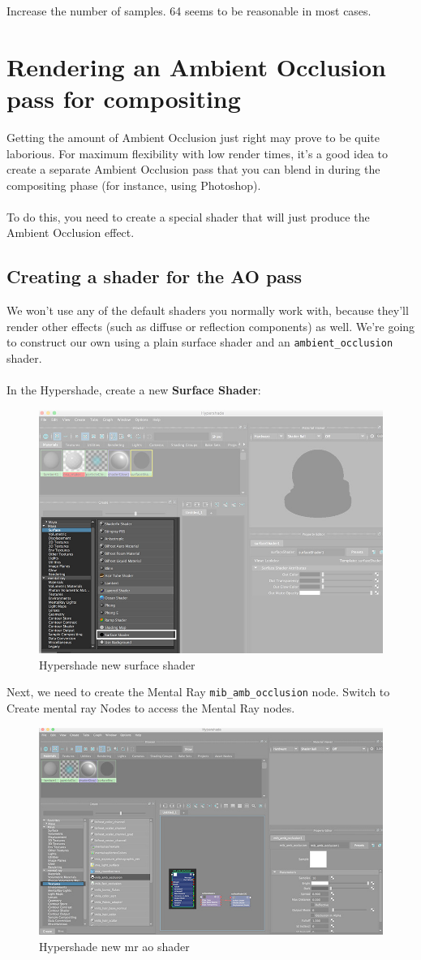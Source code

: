 \documentclass[10pt,a4paper]{article}
\begin{document}
Increase the number of samples. 64 seems to be reasonable in most cases.

\section{Rendering an Ambient Occlusion pass for compositing}
Getting the amount of Ambient Occlusion just right may prove to be quite laborious. For maximum flexibility with low render times, it's a good idea to create a separate Ambient Occlusion pass that you can blend in during the compositing phase (for instance, using Photoshop).
\\
\\
To do this, you need to create a special shader that will just produce the Ambient Occlusion effect.

\subsection{Creating a shader for the AO pass}
We won't use any of the default shaders you normally work with, because they'll render other effects (such as diffuse or reflection components) as well. We're going to construct our own using a plain surface shader and an \lstinline{ambient_occlusion} shader.
\\
\\
In the Hypershade, create a new \textbf{Surface Shader}:

\begin{figure}[htb]
\centering
\includegraphics[width=0.5\linewidth]{figure/Hypershade_new_surface_shader}
\caption{Hypershade new surface shader}
\label{fig:hypershadenewsurfaceshader}
\end{figure}

Next, we need to create the Mental Ray \lstinline{mib_amb_occlusion} node. Switch to Create mental ray Nodes to access the Mental Ray nodes.

\begin{figure}[tbh]
\centering
\includegraphics[width=0.5\linewidth]{figure/Hypershade_new_mr_ao_shader}
\caption{Hypershade new mr ao shader}
\label{fig:hypershadenewmraoshader}
\end{figure}
\end{document}
